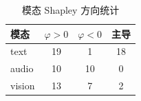 \begin{table}[htbp]
  \centering
\caption{模态 Shapley 方向统计}
  \label{tab:p3-direction}
  \begin{tabularx}{\textwidth}{@{}Xccc@{}}
    \toprule
    模态 & $\varphi{>}0$ & $\varphi{<}0$ & 主导 \\
    \midrule
    text & 19 & 1 & 18 \\
    audio & 10 & 10 & 0 \\
    vision & 13 & 7 & 2 \\
    \bottomrule
  \end{tabularx}
\end{table}